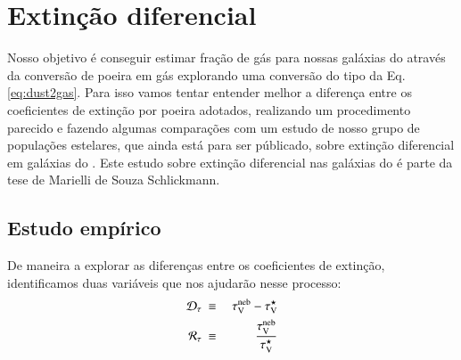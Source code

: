 



\chapter{Extinção diferencial}
\label{sec:difextin}

Nosso objetivo é conseguir estimar fração de gás para nossas galáxias do \CAL através da conversão
de poeira em gás explorando uma conversão do tipo da Eq. \ref{eq:dust2gas}. Para isso vamos tentar
entender melhor a diferença entre os coeficientes de extinção por poeira adotados, realizando um
procedimento parecido e fazendo algumas comparações com um estudo de nosso grupo de populações
estelares, que ainda está para ser públicado, sobre extinção diferencial em galáxias do \SDSS.
Este estudo sobre extinção diferencial nas galáxias do \SDSS é parte da tese de Marielli de Souza
Schlickmann.

\section{Estudo empírico}
\label{sec:difextin:emp}

De maneira a explorar as diferenças entre os coeficientes de extinção, identificamos duas variáveis
que nos ajudarão nesse processo:
\begin{eqnarray}
	\mathcal{D}_\tau\ &\equiv&\ \tau_{\mathrm{V}}^{\mathrm{neb}} - \tau_{\mathrm{V}}^\star \\
	\label{eq:difftau}
	\mathcal{R}_\tau\ &\equiv&\ \frac{\tau_{\mathrm{V}}^{\mathrm{neb}}}{\tau_{\mathrm{V}}^\star} 
	\label{eq:ratiotau}
\end{eqnarray}

